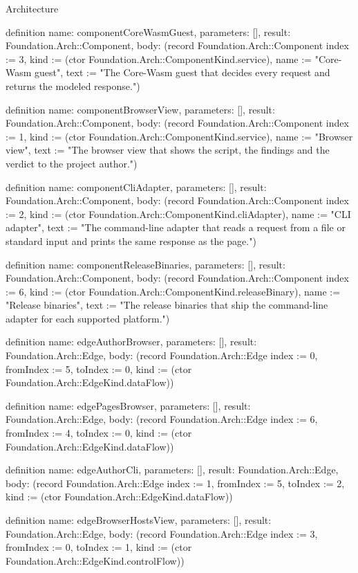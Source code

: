 \begin{lexlean}{Architecture}
\begin{semanticmodule}
definition{
  name: componentCoreWasmGuest,
  parameters: [],
  result: Foundation.Arch::Component,
  body: (record Foundation.Arch::Component {index := 3, kind := (ctor Foundation.Arch::ComponentKind.service), name := "Core-Wasm guest", text := "The Core-Wasm guest that decides every request and returns the modeled response."})
}

definition{
  name: componentBrowserView,
  parameters: [],
  result: Foundation.Arch::Component,
  body: (record Foundation.Arch::Component {index := 1, kind := (ctor Foundation.Arch::ComponentKind.service), name := "Browser view", text := "The browser view that shows the script, the findings and the verdict to the project author."})
}

definition{
  name: componentCliAdapter,
  parameters: [],
  result: Foundation.Arch::Component,
  body: (record Foundation.Arch::Component {index := 2, kind := (ctor Foundation.Arch::ComponentKind.cliAdapter), name := "CLI adapter", text := "The command-line adapter that reads a request from a file or standard input and prints the same response as the page."})
}

definition{
  name: componentReleaseBinaries,
  parameters: [],
  result: Foundation.Arch::Component,
  body: (record Foundation.Arch::Component {index := 6, kind := (ctor Foundation.Arch::ComponentKind.releaseBinary), name := "Release binaries", text := "The release binaries that ship the command-line adapter for each supported platform."})
}

definition{
  name: edgeAuthorBrowser,
  parameters: [],
  result: Foundation.Arch::Edge,
  body: (record Foundation.Arch::Edge {index := 0, fromIndex := 5, toIndex := 0, kind := (ctor Foundation.Arch::EdgeKind.dataFlow)})
}

definition{
  name: edgePagesBrowser,
  parameters: [],
  result: Foundation.Arch::Edge,
  body: (record Foundation.Arch::Edge {index := 6, fromIndex := 4, toIndex := 0, kind := (ctor Foundation.Arch::EdgeKind.dataFlow)})
}

definition{
  name: edgeAuthorCli,
  parameters: [],
  result: Foundation.Arch::Edge,
  body: (record Foundation.Arch::Edge {index := 1, fromIndex := 5, toIndex := 2, kind := (ctor Foundation.Arch::EdgeKind.dataFlow)})
}

definition{
  name: edgeBrowserHostsView,
  parameters: [],
  result: Foundation.Arch::Edge,
  body: (record Foundation.Arch::Edge {index := 3, fromIndex := 0, toIndex := 1, kind := (ctor Foundation.Arch::EdgeKind.controlFlow)})
}


\end{semanticmodule}
\end{lexlean}
